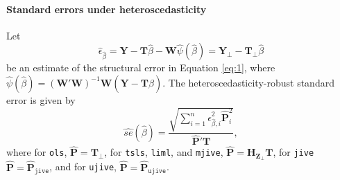 \documentclass{mynotes}
\newcommand{\by}{\mathbf{Y}} %
\newcommand{\bt}{\mathbf{T}} %
\newcommand{\bz}{\mathbf{Z}} %
\newcommand{\bp}{\mathbf{P}} %
\newcommand{\bw}{\mathbf{W}} %
\newcommand{\Hm}[1]{\mathbf{H}_{#1}} %
\begin{document}
\paragraph{Standard errors under heteroscedasticity}
Let
\begin{equation*}
  \hat{\epsilon}_{\hat{\beta}}=\by-\bt\hat{\beta}-\bw\hat{\psi}(\hat{\beta})
  =\by_{\perp}-\bt_{\perp}\hat{\beta}
\end{equation*}
be an estimate of the structural error in Equation \eqref{eq:1}, where
$\hat{\psi}(\hat{\beta})=(\bw'\bw)^{-1}\bw(\by-\bt\hat{\beta})$. The
heteroscedasticity-robust standard error is given by
\begin{equation*}
  \widehat{se}(\hat{\beta})  =\frac{\sqrt{\sum_{i=1}^{n}
      \hat{\epsilon}_{\hat{\beta},i}^{2}\hat{\bp}_{i}^{2}}}{\hat{\bp}'\bt},
\end{equation*}
where for \texttt{ols}, $\hat{\bp}=\bt_{\perp}$, for \texttt{tsls},
\texttt{liml}, and \texttt{mjive}, $\hat{\bp}=\Hm{\bz_{\perp}}\bt$, for
\texttt{jive} $\hat{\bp}=\hat{\bp}_{\mathtt{jive}}$, and for \texttt{ujive},
$\hat{\bp}=\hat{\bp}_{\mathtt{ujive}}$.
\end{document}
